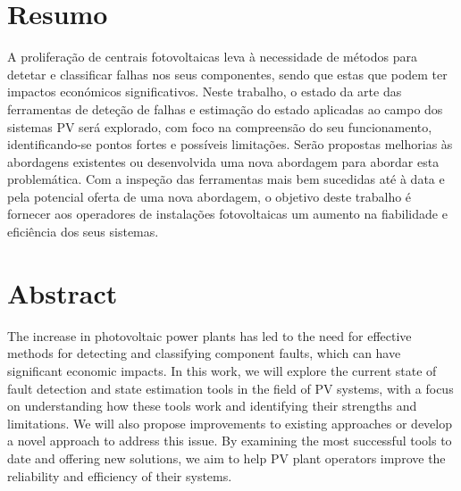 \chapter*{Resumo}

A proliferação de centrais fotovoltaicas leva à necessidade de métodos para detetar e classificar falhas nos seus componentes, sendo que estas que podem ter impactos económicos significativos. Neste trabalho, o estado da arte das ferramentas de deteção de falhas e estimação do estado aplicadas ao campo dos sistemas PV será explorado, com foco na compreensão do seu funcionamento, identificando-se pontos fortes e possíveis limitações. Serão propostas melhorias às abordagens existentes ou desenvolvida uma nova abordagem para abordar esta problemática. Com a inspeção das ferramentas mais bem sucedidas até à data e pela potencial oferta de uma nova abordagem, o objetivo deste trabalho é fornecer aos operadores de instalações fotovoltaicas um aumento na fiabilidade e eficiência dos seus sistemas.


\chapter*{Abstract}

The increase in photovoltaic power plants has led to the need for effective methods for detecting and classifying component faults, which can have significant economic impacts. In this work, we will explore the current state of fault detection and state estimation tools in the field of PV systems, with a focus on understanding how these tools work and identifying their strengths and limitations. We will also propose improvements to existing approaches or develop a novel approach to address this issue. By examining the most successful tools to date and offering new solutions, we aim to help PV plant operators improve the reliability and efficiency of their systems.